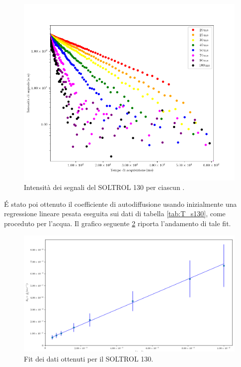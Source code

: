 \begin{figure}[h!]
\centering
\includegraphics[scale=0.3]{Figure/SOLTROL130_SigTSig.png}
\caption{Intensità dei segnali del SOLTROL 130 per ciascun \tau.}
\label{fig:S_s130}
\end{figure}

\'E stato poi ottenuto il coefficiente di autodiffusione usando inizialmente una regressione lineare pesata eseguita sui dati di tabella \ref{tab:T_s130}, come proceduto per l'acqua.
Il grafico seguente \ref{fig:Df_s130} riporta l'andamento di tale fit.

\begin{figure}[h!]
\centering
\includegraphics[scale=0.3]{Figure/SOLTROL130_calc.png}
\caption{Fit dei dati ottenuti per il SOLTROL 130.}
\label{fig:Df_s130}
\end{figure}

